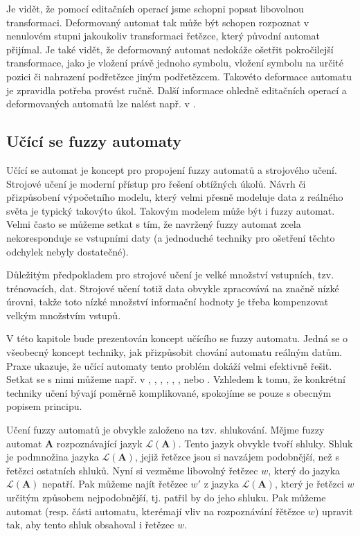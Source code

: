 \documentclass[a4paper,10pt]{article}
\begin{document}
Je vidět, že pomocí editačních operací jsme schopni popsat libovolnou transformaci. Deformovaný automat tak může být schopen rozpoznat v nenulovém stupni jakoukoliv transformaci řetězce, který původní automat přijímal. Je také vidět, že deformovaný automat nedokáže ošetřit pokročilejší transformace, jako je vložení právě jednoho symbolu, vložení symbolu na určité pozici či nahrazení podřetězce jiným podřetězcem. Takovéto deformace automatu je zpravidla potřeba provést ručně. Další informace ohledně editačních operací a deformovaných automatů lze nalést např. v \cite{AstGonMenGar-FuzzAutEpsMovCmpFuzzMeasBtwStrs}.

\subsection{Učící se fuzzy automaty}
Učící se automat je koncept pro propojení fuzzy automatů a strojového učení. Strojové učení je moderní přístup pro řešení obtížných úkolů. Návrh či přizpůsobení výpočetního modelu, který velmi přesně modeluje data z reálného světa je typický takovýto úkol. Takovým modelem může být i fuzzy automat. Velmi často se můžeme setkat s tím, že navržený fuzzy automat zcela nekoresponduje se vstupními daty (a jednoduché techniky pro ošetření těchto odchylek nebyly dostatečné). 

Důležitým předpokladem pro strojové učení je velké množství vstupních, tzv. trénovacích, dat. Strojové učení totiž data obvykle zpracovává na značně nízké úrovni, takže toto nízké množství informační hodnoty je třeba kompenzovat velkým množstvím vstupů.

V této kapitole bude prezentován koncept učícího se fuzzy automatu. Jedná se o všeobecný koncept techniky, jak přizpůsobit chování automatu reálným datům. Praxe ukazuje, že učící automaty tento problém dokáží velmi efektivně řešit. Setkat se s nimi můžeme např. v \cite{FuLi-ForLeaAutAutGam}, \cite{WeeFu-FormFuzAutAppModLeaSys}, \cite{GilOmlTho-EquKnoRep+}, \cite{TzaRig-StaAnaAdaFuzzConSysUsiPetrNetLeaAut}, \cite{PatMor-EdgDetTecFuzzLogCEllLeaAutFuzzImPro}, \cite{MarMeySol-HybMetGasDifModFuzCelAutImSha}, \cite{SinGha+HybrEdgDetMetFuzSetTheCelLeaAut} \cite{AstGariGonVillFar-ApprStrMatUsiDefFuzzAutLearExpr} nebo \cite{ZhiMinLan-EvoStraIndFuFiStaAu}. Vzhledem k tomu, že konkrétní techniky učení bývají poměrně komplikované, spokojíme se pouze s obecným popisem principu.

Učení fuzzy automatů je obvykle založeno na tzv. shlukování. Mějme fuzzy automat $\mathbf{A}$ rozpoznávající jazyk  $\mathcal{L}(\mathbf{A})$. Tento jazyk obvykle tvoří shluky. Shluk je podmnožina jazyka $\mathcal{L}(\mathbf{A})$, jejiž řetězce jsou si navzájem podobnější, než s řetězci ostatních shluků. Nyní si vezměme libovolný řetězec $w$, který do jazyka $\mathcal{L}(\mathbf{A})$ nepatří. Pak můžeme najít řetězec $w'$ z jazyka $\mathcal{L}(\mathbf{A})$, který je řetězci $w$ určitým způsobem nejpodobnější, tj. patřil by do jeho shluku. Pak můžeme automat (resp. části automatu, kterémají vliv na rozpoznávání řětězce $w$) upravit tak, aby tento shluk obsahoval i řetězec $w$.
\end{document}
